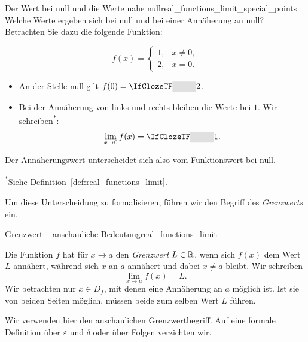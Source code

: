 \begin{ExampleBox}{Der Wert bei null und die Werte nahe null}{real_functions_limit_special_points}
  Welche Werte ergeben sich bei null und bei einer Annäherung an null?
  Betrachten Sie dazu die folgende Funktion:
  \par\smallskip\noindent
  \begin{minipage}[c]{0.48\linewidth}
    \[
      f(x)=\begin{cases}1,&x\ne0,\\2,&x=0.\end{cases}
    \]
  \end{minipage}\hfill
  \begin{minipage}[c]{0.47\linewidth}
    \centering
  \end{minipage}
  \par\smallskip
  \begin{itemize}
    \item An der Stelle null gilt $f(0)=\Cloze{1cm}{2}$.
    \item Bei der Annäherung von links und rechts bleiben die Werte
      bei $1$. Wir schreiben\textsuperscript{*}:
      \[
        \lim_{x\to0}f(x)=\Cloze{1cm}{1}.
      \]
  \end{itemize}
  \par\medskip
  Der Annäherungswert unterscheidet sich also vom Funktionswert bei null.
  \par\smallskip
  {\footnotesize\textsuperscript{*}Siehe Definition~\ref{def:real_functions_limit}.}
\end{ExampleBox}
Um diese Unterscheidung zu formalisieren, führen wir den Begriff des
\emph{Grenzwerts}  ein.
\begin{DefinitionBox}{Grenzwert -- anschauliche Bedeutung}{real_functions_limit}
  \noindent
  \begin{minipage}[c]{0.49\linewidth}
    Die Funktion $f$ hat für $x\to a$ den \emph{Grenzwert} $L\in\mathbb{R}$,
    wenn sich $f(x)$ dem Wert $L$ annähert, während sich $x$ an $a$
    annähert und dabei $x\ne a$ bleibt. Wir schreiben
    \[
      \lim_{x\to a}f(x)=L.
    \]
    Wir betrachten nur $x\in D_f$, mit denen eine Annäherung an $a$
    möglich ist. Ist sie von beiden Seiten möglich, müssen beide
    zum selben Wert $L$ führen.
  \end{minipage}\hfill
  \begin{minipage}[c]{0.47\linewidth}
    \centering
  \end{minipage}
\end{DefinitionBox}
Wir verwenden hier den anschaulichen Grenzwertbegriff. Auf eine formale
Definition über $\varepsilon$ und $\delta$ oder über Folgen verzichten wir.

